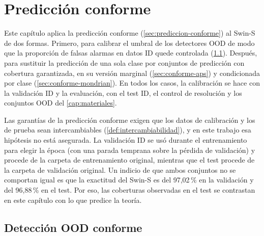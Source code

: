 %

\chapter{Predicción conforme}\label{cap:conforme}


Este capítulo aplica la predicción conforme (\cref{sec:prediccion-conforme}) al
Swin-S de dos formas. Primero, para calibrar el umbral de los detectores OOD de
modo que la proporción de falsas alarmas en datos ID quede controlada
(\cref{sec:conforme-ood}). Después, para sustituir la predicción de una sola clase
por conjuntos de predicción con cobertura garantizada, en su versión marginal
(\cref{sec:conforme-aps}) y condicionada por clase (\cref{sec:conforme-mondrian}).
En todos los casos, la calibración se hace con la validación ID y la evaluación,
con el test ID, el control de resolución y los conjuntos OOD del
\cref{cap:materiales}.

Las garantías de la predicción conforme exigen que los datos de calibración y los
de prueba sean intercambiables (\cref{def:intercambiabilidad}), y en este trabajo
esa hipótesis no está asegurada. La validación ID se usó durante el entrenamiento
para elegir la época (con una parada temprana sobre la pérdida de validación) y
procede de la carpeta de entrenamiento original, mientras que el test procede de
la carpeta de validación original. Un indicio de que ambos conjuntos no se
comportan igual es que la exactitud del Swin-S es del 97,02\,\% en la validación y
del 96,88\,\% en el test. Por eso, las coberturas observadas en el test se
contrastan en este capítulo con lo que predice la teoría.

\section{Detección OOD conforme}\label{sec:conforme-ood}

